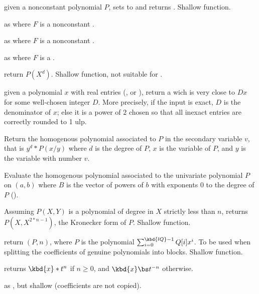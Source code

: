  given a nonconstant polynomial
$P$, sets  to  and
returns . Shallow function.

as  where $F$ is a nonconstant .

as  where $F$ is a nonconstant .

as  where $F$ is a .

 return $P(X^d)$. Shallow function, not
suitable for .

 given a polynomial $x$ with real entries
(,  or ), return a  wich is very close
to $D x$ for some well-chosen integer $D$. More precisely, if the input is
exact, $D$ is the denominator of $x$; else it is a power of $2$ chosen
so that all inexact entries are correctly rounded to 1 ulp.

 Return the homogenous polynomial
associated to $P$ in the secondary variable $v$, that is $y^d*P(x/y)$ where $d$
is the degree of $P$, $x$ is the variable of $P$, and  $y$ is the variable with
number $v$.

Evaluate the homogenous polynomial associated to the univariate polynomial
$P$ on $(a,b)$ where $B$ is the vector of powers of $b$ with exponents
$0$ to the degree of $P$ ().

 Assuming $P(X,Y)$ is a polynomial
of degree in $X$ strictly less than $n$, returns $P(X,X^{2*n-1})$, the
Kronecker form of $P$. Shallow function.

 return
$(P, n)$, where $P$ is the polynomial
$\sum_{i = 0}^{\kbd{lQ} - 1} Q[i] x^i$. To be used when splitting
the coefficients of genuine polynomials into blocks. Shallow function.


 returns $\kbd{x} * t^n$ if $n\geq 0$,
and $\kbd{x} \bs t^{-n}$ otherwise.

 as , but
shallow (coefficients are not copied).

